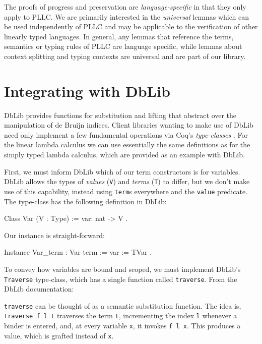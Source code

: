 \documentclass[]{unswthesis}
\let\c\texttt
\let\i\textit
\begin{document}
The proofs of progress and preservation are \i{language-specific} in that they only apply to PLLC. We are primarily interested in the \i{universal} lemmas which can be used independently of PLLC and may be applicable to the verification of other linearly typed languages. In general, any lemmas that reference the terms, semantics or typing rules of PLLC are language specific, while lemmas about context splitting and typing contexts are universal and are part of our library.

\section{Integrating with DbLib}
\label{sec:dblib-int}

DbLib provides functions for substitution and lifting that abstract over the manipulation of de Bruijn indices. Client libraries wanting to make use of DbLib need only implement a few fundamental operations via Coq's \i{type-classes} \cite{coqTypeClasses}. For the linear lambda calculus we can use essentially the same definitions as for the simply typed lambda calculus, which are provided as an example with DbLib.

First, we must inform DbLib which of our term constructors is for variables. DbLib allows the types of \i{values} (\c{V}) and \i{terms} (\c{T}) to differ, but we don't make use of this capability, instead using \c{term}s everywhere and the \c{value} predicate. The type-class has the following definition in DbLib:

\begin{coqcode}
Class Var (V : Type) := {
  var: nat -> V
}.
\end{coqcode}

Our instance is straight-forward:

\begin{coqcode}
Instance Var_term : Var term := {
  var := TVar
}.
\end{coqcode}

To convey how variables are bound and scoped, we must implement DbLib's \c{Traverse} type-class, which has a single function called \c{traverse}. From the DbLib documentation:

\begin{displayquote}
\c{traverse} can be thought of as a semantic substitution function. The idea is, \c{traverse f l t} traverses the term \c{t}, incrementing the index \c{l} whenever a binder is entered, and, at every variable \c{x}, it invokes \c{f l x}. This produces a value, which is grafted instead of \c{x}.
\end{displayquote}
\end{document}
